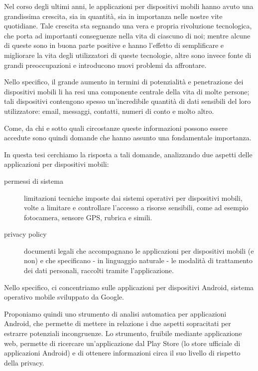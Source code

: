 
Nel corso degli ultimi anni, le applicazioni per dispositivi mobili hanno avuto una grandissima crescita, sia in quantità, sia in importanza nelle nostre vite quotidiane.
Tale crescita sta segnando una vera e propria rivoluzione tecnologica, che porta ad importanti conseguenze nella vita di ciascuno di noi; mentre alcune di queste sono in buona parte positive e hanno l'effetto di semplificare e migliorare la vita degli utilizzatori di queste tecnologie, altre sono invece fonte di grandi preoccupazioni e introducono nuovi problemi da affrontare.

Nello specifico, il grande aumento in termini di potenzialità e penetrazione dei dispositivi mobili li ha resi una componente centrale della vita di molte persone; tali dispositivi contengono spesso un'incredibile quantità di dati sensibili del loro utilizzatore: email, messaggi, contatti, numeri di conto e molto altro.

Come, da chi e sotto quali circostanze queste informazioni possono essere accedute sono quindi domande che hanno assunto una fondamentale importanza.

In questa tesi cerchiamo la risposta a tali domande, analizzando due aspetti delle applicazioni per dispositivi mobili:

\begin{description}
  \item[permessi di sistema] limitazioni tecniche imposte dai sistemi operativi per dispositivi mobili, volte a limitare e controllare l'accesso a risorse sensibili, come ad esempio fotocamera, sensore GPS, rubrica e simili.
  \item[privacy policy] documenti legali che accompagnano le applicazioni per dispositivi mobili (e non) e che specificano - in linguaggio naturale - le modalità di trattamento dei dati personali, raccolti tramite l'applicazione.
\end{description}

Nello specifico, ci concentriamo sulle applicazioni per dispositivi Android, sistema operativo mobile sviluppato da Google.

Proponiamo quindi uno strumento di analisi automatica per applicazioni Android, che permette di mettere in relazione i due aspetti sopracitati per estrarre potenziali incongruenze.
Lo strumento, fruibile mediante applicazione web, permette di ricercare un'applicazione dal Play Store (lo store ufficiale di applicazioni Android) e di ottenere informazioni circa il suo livello di rispetto della privacy.

